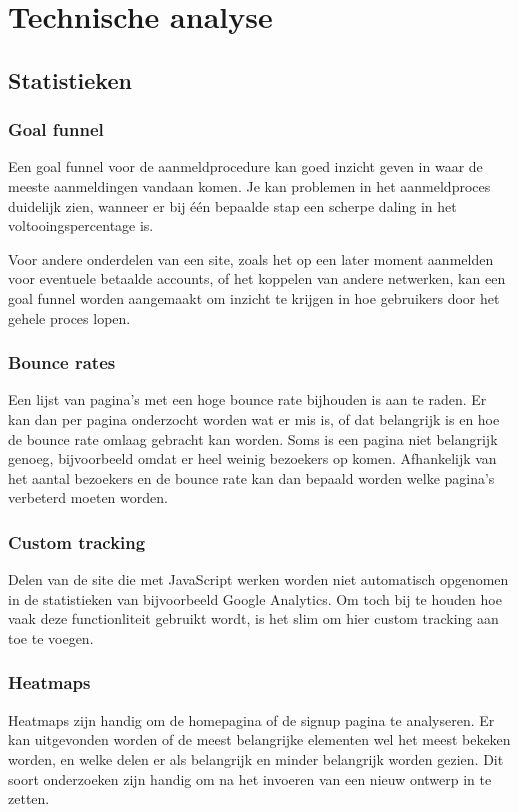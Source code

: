 \documentclass[a4paper, 10pt, pdftex]{report}
\begin{document}
  \section{Technische analyse}
    \subsection{Statistieken}
      \subsubsection{Goal funnel}
        Een goal funnel voor de aanmeldprocedure kan goed inzicht geven in waar de meeste aanmeldingen vandaan komen. Je kan problemen in het aanmeldproces duidelijk zien, wanneer er bij \'e\'en bepaalde stap een scherpe daling in het voltooingspercentage is.

        Voor andere onderdelen van een site, zoals het op een later moment aanmelden voor eventuele betaalde accounts, of het koppelen van andere netwerken, kan een goal funnel worden aangemaakt om inzicht te krijgen in hoe gebruikers door het gehele proces lopen.

      \subsubsection{Bounce rates}
        Een lijst van pagina's met een hoge bounce rate bijhouden is aan te raden. Er kan dan per pagina onderzocht worden wat er mis is, of dat belangrijk is en hoe de bounce rate omlaag gebracht kan worden. Soms is een pagina niet belangrijk genoeg, bijvoorbeeld omdat er heel weinig bezoekers op komen. Afhankelijk van het aantal bezoekers en de bounce rate kan dan bepaald worden welke pagina's verbeterd moeten worden.

      \subsubsection{Custom tracking}
        Delen van de site die met JavaScript werken worden niet automatisch opgenomen in de statistieken van bijvoorbeeld Google Analytics. Om toch bij te houden hoe vaak deze functionliteit gebruikt wordt, is het slim om hier custom tracking aan toe te voegen.

      \subsubsection{Heatmaps}
        Heatmaps zijn handig om de homepagina of de signup pagina te analyseren. Er kan uitgevonden worden of de meest belangrijke elementen wel het meest bekeken worden, en welke delen er als belangrijk en minder belangrijk worden gezien. Dit soort onderzoeken zijn handig om na het invoeren van een nieuw ontwerp in te zetten.
\end{document}
